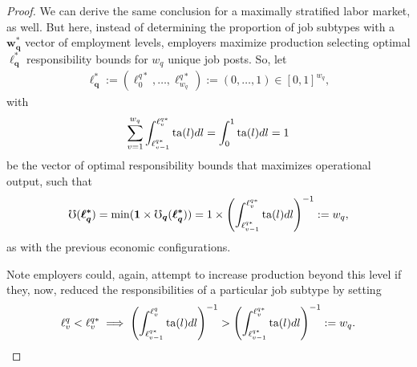 \documentclass[hidelinks, nonatbib]{elsarticle}
\begin{document}
\begin{lemma}
\begin{proof}
        We can derive the same conclusion for a maximally stratified labor market, as well. But here, instead of determining the proportion of job subtypes with a $\boldsymbol{w_{q}^{*}}$ vector of employment levels, employers maximize production selecting optimal $\boldsymbol{\ell_{q}^{*}}$ responsibility bounds for $w_q$ unique job posts. So, let 
        \begin{gather}
            \boldsymbol{\ell_{q}^{*}}
            :=
            (\ell_{0}^{q*}, \dots, \ell_{w_q}^{q*})
            :=
            (0, \dots, 1) 
            \in [0,1]^{w_q}
            ,
        \end{gather}
        with
        \begin{gather}
        \sum_{v=1}^{w_q}
        \int_{
            \ell_{v-1}^{q*}
        }^{
            \ell_{v}^{q*}
        }
        \text{ta}(l)dl
        =
        \int_{0}^{1}
        \text{ta}(l)dl
        =
        1
        \end{gather}
        be the vector of optimal responsibility bounds that maximizes operational output, such that
        \begin{gather}
            \mho(\boldsymbol{\ell_{q}^{*}})
            =
            \min(
                \boldsymbol{1}
                \times
                \boldsymbol{\mho_q}(
                    \boldsymbol{\ell_{q}^{*}}
                )
            )
            =
            1
            \times
            \left(
                \int_{
                    \ell_{v-1}^{q*}
                }^{
                    \ell_{v}^{q*}
                }
                \text{ta}(l)dl
            \right) ^ {-1}
            :=
            w_q
            ,
        \end{gather}
        as with the previous economic configurations.
        
        Note employers could, again, attempt to increase production beyond this level if they, now, reduced the responsibilities of a particular job subtype by setting
        \begin{align}
        \ell_{v}^{q} < \ell_{v}^{q*}
        \implies
            \left(
                \int_{
                    \ell_{v-1}^{q*}
                }^{
                    \ell_{v}^{q}
                }
                \text{ta}(l)dl
            \right) ^ {-1}
            >
            \left(
                \int_{
                    \ell_{v-1}^{q*}
                }^{
                    \ell_{v}^{q*}
                }
                \text{ta}(l)dl
            \right) ^ {-1}
            :=
            w_q
            .
        \end{align}
        

\end{proof}
\end{lemma}
\end{document}
